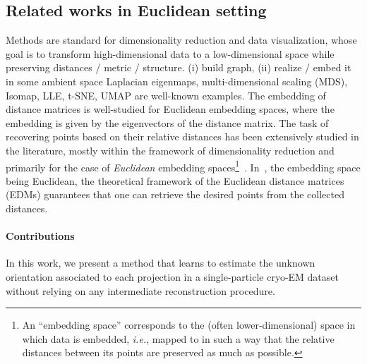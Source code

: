 
\subsection{Related works in Euclidean setting}


Methods are standard for dimensionality reduction and data visualization, whose goal is to transform high-dimensional data to a low-dimensional space while preserving distances / metric / structure.
(i) build graph, (ii) realize / embed it in some ambient space
Laplacian eigenmaps, multi-dimensional scaling (MDS), Isomap, LLE, t-SNE, UMAP are well-known examples.
The embedding of distance matrices is well-studied for Euclidean embedding spaces, where the embedding is given by the eigenvectors of the distance matrix.
The task of recovering points based on their relative distances has been extensively studied in the literature, mostly within the framework of dimensionality reduction and primarily for the case of \textit{Euclidean} embedding spaces\footnote{An ``embedding space'' corresponds to the (often lower-dimensional) space in which data is embedded, \textit{i.e.}, mapped to in such a way that the relative distances between its points are preserved as much as possible.}~\cite{belkin2003laplacian,kruskal1978multidimensional, maaten2008visualizing, mcinnes2018umap,dokmanic2015euclidean}.
In~\cite{dokmanic2015euclidean}, the embedding space being Euclidean, the theoretical framework of the Euclidean distance matrices (EDMs) guarantees that one can retrieve the desired points from the collected distances.


\paragraph{Contributions}
In this work, we present a method that learns to estimate the unknown orientation associated to each projection in a single-particle cryo-EM dataset without relying on any intermediate reconstruction procedure.

